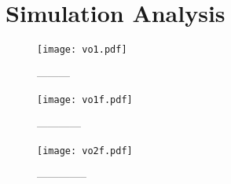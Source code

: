 \section{Simulation Analysis}
\label{sec:simulation}

\begin{figure}[H] \centering
  \texttt{[image: vo1.pdf]}
  \caption{---------}
  \label{fig:acm}
  \end{figure}


  \begin{figure}[H] \centering
    \texttt{[image: vo1f.pdf]}
    \caption{------------}
    \label{fig:acm}
    \end{figure}


    \begin{figure}[H] \centering
      \texttt{[image: vo2f.pdf]}
      \caption{--------------}
      \label{fig:acm}
      \end{figure}
